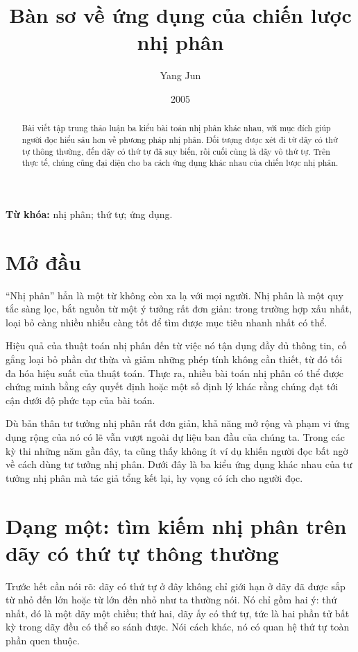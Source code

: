 \documentclass[11pt]{article}
\title{Bàn sơ về ứng dụng của chiến lược nhị phân}
\author{Yang Jun}
\date{2005}
\begin{document}
\maketitle


\renewcommand{\abstractname}{Tóm tắt}
\begin{abstract}
Bài viết tập trung thảo luận ba kiểu bài toán nhị phân khác nhau, với mục đích
giúp người đọc hiểu sâu hơn về phương pháp nhị phân. Đối tượng được xét đi từ
dãy có thứ tự thông thường, đến dãy có thứ tự đã suy biến, rồi cuối cùng là
dãy vô thứ tự. Trên thực tế, chúng cũng đại diện cho ba cách ứng dụng khác
nhau của chiến lược nhị phân.
\end{abstract}

\noindent\textbf{Từ khóa:} nhị phân; thứ tự; ứng dụng.

\section{Mở đầu}

``Nhị phân'' hẳn là một từ không còn xa lạ với mọi người. Nhị phân là một quy
tắc sàng lọc, bắt nguồn từ một ý tưởng rất đơn giản: trong trường hợp xấu
nhất, loại bỏ càng nhiều nhiễu càng tốt để tìm được mục tiêu nhanh nhất có
thể.

Hiệu quả của thuật toán nhị phân đến từ việc nó tận dụng đầy đủ thông tin,
cố gắng loại bỏ phần dư thừa và giảm những phép tính không cần thiết, từ đó
tối đa hóa hiệu suất của thuật toán. Thực ra, nhiều bài toán nhị phân có thể
được chứng minh bằng cây quyết định hoặc một số định lý khác rằng chúng đạt
tới cận dưới độ phức tạp của bài toán.

Dù bản thân tư tưởng nhị phân rất đơn giản, khả năng mở rộng và phạm vi ứng
dụng rộng của nó có lẽ vẫn vượt ngoài dự liệu ban đầu của chúng ta. Trong các
kỳ thi những năm gần đây, ta cũng thấy không ít ví dụ khiến người đọc bất ngờ
về cách dùng tư tưởng nhị phân. Dưới đây là ba kiểu ứng dụng khác nhau của tư
tưởng nhị phân mà tác giả tổng kết lại, hy vọng có ích cho người đọc.

\section{Dạng một: tìm kiếm nhị phân trên dãy có thứ tự thông thường}

Trước hết cần nói rõ: dãy có thứ tự ở đây không chỉ giới hạn ở dãy đã được sắp
từ nhỏ đến lớn hoặc từ lớn đến nhỏ như ta thường nói. Nó chỉ gồm hai ý: thứ
nhất, đó là một dãy một chiều; thứ hai, dãy ấy có thứ tự, tức là hai phần tử
bất kỳ trong dãy đều có thể so sánh được. Nói cách khác, nó có quan hệ thứ tự
toàn phần quen thuộc.
\end{document}
